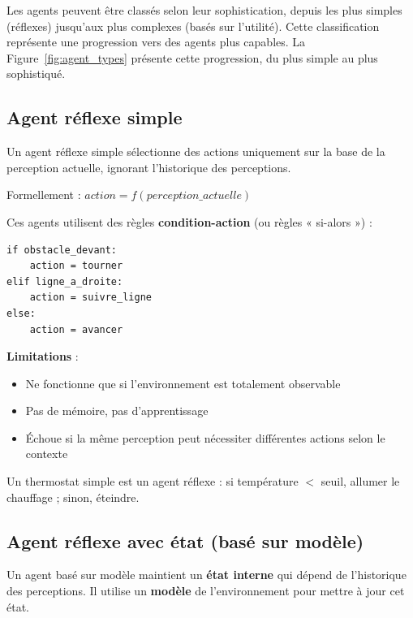 \documentclass[11pt,a4paper]{article}
\begin{document}
Les agents peuvent être classés selon leur sophistication, depuis les plus simples (réflexes) jusqu'aux plus complexes (basés sur l'utilité). Cette classification représente une progression vers des agents plus capables. La Figure~\ref{fig:agent_types} présente cette progression, du plus simple au plus sophistiqué.

\subsection{Agent réflexe simple}

\begin{definitionbox}
Un agent réflexe simple sélectionne des actions uniquement sur la base de la perception actuelle, ignorant l'historique des perceptions.
\end{definitionbox}

Formellement : $action = f(perception\_actuelle)$

Ces agents utilisent des règles \textbf{condition-action} (ou règles « si-alors ») :

\begin{lstlisting}
if obstacle_devant:
    action = tourner
elif ligne_a_droite:
    action = suivre_ligne
else:
    action = avancer
\end{lstlisting}

\textbf{Limitations} :
\begin{itemize}
    \item Ne fonctionne que si l'environnement est totalement observable
    \item Pas de mémoire, pas d'apprentissage
    \item Échoue si la même perception peut nécessiter différentes actions selon le contexte
\end{itemize}

\begin{exemplebox}
Un thermostat simple est un agent réflexe : si température $<$ seuil, allumer le chauffage ; sinon, éteindre.
\end{exemplebox}

\subsection{Agent réflexe avec état (basé sur modèle)}

\begin{definitionbox}
Un agent basé sur modèle maintient un \textbf{état interne} qui dépend de l'historique des perceptions. Il utilise un \textbf{modèle} de l'environnement pour mettre à jour cet état.
\end{definitionbox}
\end{document}

